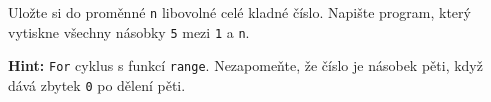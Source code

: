 \question[50]
Uložte si do proměnné \texttt{n} libovolné celé kladné číslo. Napište program,
který vytiskne všechny násobky \texttt{5} mezi \texttt{1} a \texttt{n}.

\textbf{Hint:} \texttt{For} cyklus s funkcí \texttt{range}. Nezapomeňte, že
číslo je násobek pěti, když dává zbytek \texttt{0} po dělení pěti.
